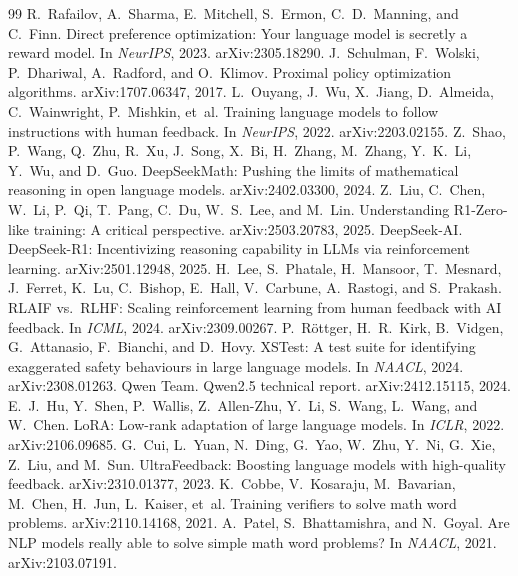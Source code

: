 \documentclass{article}
\begin{document}
\begin{thebibliography}{99}\small
{} R.~Rafailov, A.~Sharma, E.~Mitchell, S.~Ermon, C.~D.~Manning, and C.~Finn. Direct preference
  optimization: Your language model is secretly a reward model. In \emph{NeurIPS}, 2023. arXiv:2305.18290.
 J.~Schulman, F.~Wolski, P.~Dhariwal, A.~Radford, and O.~Klimov. Proximal policy optimization
  algorithms. arXiv:1707.06347, 2017.
 L.~Ouyang, J.~Wu, X.~Jiang, D.~Almeida, C.~Wainwright, P.~Mishkin, et~al. Training language models
  to follow instructions with human feedback. In \emph{NeurIPS}, 2022. arXiv:2203.02155.
 Z.~Shao, P.~Wang, Q.~Zhu, R.~Xu, J.~Song, X.~Bi, H.~Zhang, M.~Zhang, Y.~K.~Li, Y.~Wu, and D.~Guo.
  DeepSeekMath: Pushing the limits of mathematical reasoning in open language models. arXiv:2402.03300, 2024.
 Z.~Liu, C.~Chen, W.~Li, P.~Qi, T.~Pang, C.~Du, W.~S.~Lee, and M.~Lin. Understanding R1-Zero-like
  training: A critical perspective. arXiv:2503.20783, 2025.
 DeepSeek-AI. DeepSeek-R1: Incentivizing reasoning capability in LLMs via reinforcement
  learning. arXiv:2501.12948, 2025.
 H.~Lee, S.~Phatale, H.~Mansoor, T.~Mesnard, J.~Ferret, K.~Lu, C.~Bishop, E.~Hall, V.~Carbune,
  A.~Rastogi, and S.~Prakash. RLAIF vs.\ RLHF: Scaling reinforcement learning from human feedback with AI feedback.
  In \emph{ICML}, 2024. arXiv:2309.00267.
 P.~R\"ottger, H.~R.~Kirk, B.~Vidgen, G.~Attanasio, F.~Bianchi, and D.~Hovy. XSTest: A test suite
  for identifying exaggerated safety behaviours in large language models. In \emph{NAACL}, 2024. arXiv:2308.01263.
 Qwen Team. Qwen2.5 technical report. arXiv:2412.15115, 2024.
 E.~J.~Hu, Y.~Shen, P.~Wallis, Z.~Allen-Zhu, Y.~Li, S.~Wang, L.~Wang, and W.~Chen. LoRA: Low-rank
  adaptation of large language models. In \emph{ICLR}, 2022. arXiv:2106.09685.
 G.~Cui, L.~Yuan, N.~Ding, G.~Yao, W.~Zhu, Y.~Ni, G.~Xie, Z.~Liu, and M.~Sun.
  UltraFeedback: Boosting language models with high-quality feedback. arXiv:2310.01377, 2023.
 K.~Cobbe, V.~Kosaraju, M.~Bavarian, M.~Chen, H.~Jun, L.~Kaiser, et~al. Training verifiers to
  solve math word problems. arXiv:2110.14168, 2021.
 A.~Patel, S.~Bhattamishra, and N.~Goyal. Are NLP models really able to solve simple math
  word problems? In \emph{NAACL}, 2021. arXiv:2103.07191.
\end{thebibliography}
\end{document}
